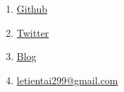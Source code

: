 \begin{enumerate}
  \item \href{https://github.com/letientai299}{Github}
  \item \href{https://twitter.com/letientai299}{Twitter}
  \item \href{https://letientai299.github.io}{Blog}
  \item \href{mailto:letientai299@gmail.com}{letientai299@gmail.com}
\end{enumerate}
